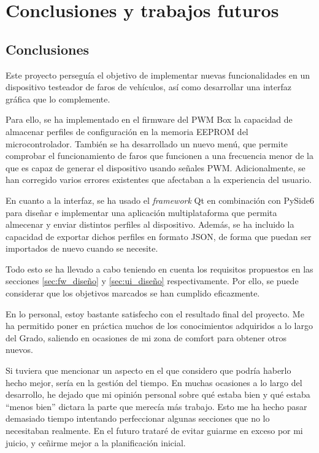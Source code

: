 \chapter{Conclusiones y trabajos futuros}

\section{Conclusiones}

Este proyecto perseguía el objetivo de implementar nuevas funcionalidades en un dispositivo testeador de faros de vehículos, así como desarrollar una interfaz gráfica que lo complemente.

Para ello, se ha implementado en el firmware del PWM Box la capacidad de almacenar perfiles de configuración en la memoria EEPROM del microcontrolador. También se ha desarrollado un nuevo menú, que permite comprobar el funcionamiento de faros que funcionen a una frecuencia menor de la que es capaz de generar el dispositivo usando señales PWM. Adicionalmente, se han corregido varios errores existentes que afectaban a la experiencia del usuario.

En cuanto a la interfaz, se ha usado el \textit{framework} Qt en combinación con PySide6 para diseñar e implementar una aplicación multiplataforma que permita almecenar y enviar distintos perfiles al dispositivo. Además, se ha incluido la capacidad de exportar dichos perfiles en formato JSON, de forma que puedan ser importados de nuevo cuando se necesite.

Todo esto se ha llevado a cabo teniendo en cuenta los requisitos propuestos en las secciones \ref{sec:fw_diseño} y \ref{sec:ui_diseño} respectivamente. Por ello, se puede considerar que los objetivos marcados se han cumplido eficazmente.

En lo personal, estoy bastante satisfecho con el resultado final del proyecto. Me ha permitido poner en práctica muchos de los conocimientos adquiridos a lo largo del Grado, saliendo en ocasiones de mi zona de comfort para obtener otros nuevos.

Si tuviera que mencionar un aspecto en el que considero que podría haberlo hecho mejor, sería en la gestión del tiempo. En muchas ocasiones a lo largo del desarrollo, he dejado que mi opinión personal sobre qué estaba bien y qué estaba ``menos bien'' dictara la parte que merecía más trabajo. Esto me ha hecho pasar demasiado tiempo intentando perfeccionar algunas secciones que no lo necesitaban realmente. En el futuro trataré de evitar guiarme en exceso por mi juicio, y ceñirme mejor a la planificación inicial.

